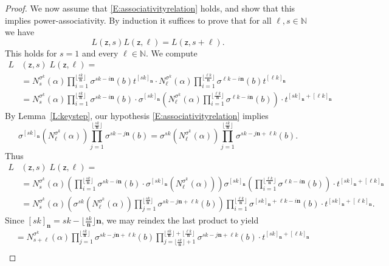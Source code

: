 \documentclass[11pt]{amsart}
\theoremstyle{plain}
\theoremstyle{definition}
\numberwithin{equation}{section}
\numberwithin{figure}{section}
\newcommand{\scz}{\mathsf{z}}  %
\newcommand{\de}{\mathbf{n}}  %
\begin{document}
\begin{proof}
    We now assume that \eqref{E:associativityrelation} holds, and show that this implies power-associativity.  By induction it suffices to prove that
    for all $\ell,s\in \mathbb{N}$ we have
    $$
    L(\scz,s)L(\scz,\ell) = L(\scz,s+\ell).
    $$
This holds for $s=1$ and every $\ell\in \mathbb{N}$.  We compute
\begin{align*}
L&(\scz,s)\; L(\scz,\ell)=\\
&=N_{s}^{\sigma^k}(\alpha)\prod_{i=1}^{\lfloor \frac{s k}{\de}\rfloor} \sigma^{s k-i\de}(b)t^{[s k]_{\de}}\cdot N_{\ell}^{\sigma^k}(\alpha)\prod_{i=1}^{\lfloor \frac{\ell k}{\de}\rfloor} \sigma^{\ell k-i\de}(b)t^{[\ell k]_{\de}}\\
&= N_{s}^{\sigma^k}(\alpha)\prod_{i=1}^{\lfloor \frac{s k}{\de}\rfloor} \sigma^{s k-i\de}(b)\cdot
\sigma^{[s k]_{\de}}\left(N_{\ell}^{\sigma^k}(\alpha)\prod_{i=1}^{\lfloor \frac{\ell k}{\de}\rfloor} \sigma^{\ell k-i\de}(b)\right) \cdot t^{[s k]_{\de} + [\ell k]_{\de}}
\end{align*}
By Lemma~\ref{L:keystep}, our hypothesis \eqref{E:associativityrelation} implies
$$
\sigma^{[sk]_\de}(N_{\ell}^{\sigma^k}(\alpha))\prod_{j=1}^{\lfloor \frac{s k}{\de}\rfloor}\sigma^{sk-j\de}(b) = \sigma^{sk}(N_{\ell}^{\sigma^k}(\alpha))\prod_{j=1}^{\lfloor \frac{s k}{\de}\rfloor}\sigma^{sk-j\de+\ell k}(b).
$$
Thus
\begin{align*}
  L&(\scz,s)\; L(\scz,\ell)=\\
  &= N_{s}^{\sigma^k}(\alpha) \left(\prod_{i=1}^{\lfloor \frac{s k}{\de}\rfloor} \sigma^{s k-i\de}(b)\cdot
\sigma^{[s k]_{\de}}(N_{\ell}^{\sigma^k}(\alpha)) \right) \sigma^{[sk]_{\de}}\left(\prod_{i=1}^{\lfloor \frac{\ell k}{\de}\rfloor} \sigma^{\ell k-i\de}(b)\right) \cdot t^{[s k]_{\de} + [\ell k]_{\de}}\\
&= N_{s}^{\sigma^k}(\alpha)
\left( \sigma^{sk}(N_{\ell}^{\sigma^k}(\alpha))\prod_{j=1}^{\lfloor \frac{s k}{\de}\rfloor}\sigma^{sk-j\de+\ell k}(b)
\right)
\prod_{i=1}^{\lfloor \frac{\ell k}{\de}\rfloor} \sigma^{[sk]_\de+\ell k-i\de}(b) \cdot t^{[s k]_{\de} + [\ell k]_{\de}}.
\end{align*}
Since $[sk]_{\de}=sk-\lfloor \frac{sk}{\de}\rfloor \de$, we may reindex the last product to yield
\begin{align*}
&= N_{s+\ell}^{\sigma^k}(\alpha)
\prod_{j=1}^{\lfloor \frac{s k}{\de}\rfloor}\sigma^{sk-j\de +\ell k}(b)
\prod_{j=\lfloor \frac{s k}{\de}\rfloor+1}^{\lfloor \frac{s k}{\de}\rfloor+\lfloor \frac{\ell k}{\de}\rfloor}\sigma^{sk-j\de+\ell k}(b)  \cdot t^{[s k]_{\de} + [\ell k]_{\de}}\\

\end{align*}
\end{proof}
\end{document}

